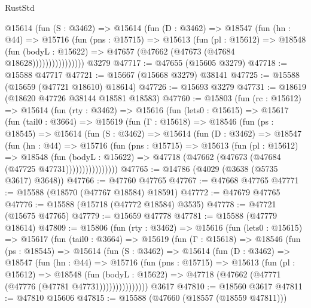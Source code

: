 \begin{lexlean}{RustStd}
\begin{coremodule}
                @15614
                  (fun (S : @3462) =>
                  @15614
                    (fun (D : @3462) =>
                    @18547
                      (fun (hn : @44) =>
                      @15716
                        (fun (pns : @15715) =>
                        @15613
                          (fun (pl : @15612) =>
                          @18548
                            (fun (bodyL : @15622) =>
                            @47657 (@47662 (@47673 (@47684 @18628))))))))))))))))
    @3279
@47717 := @47655 (@15605 @3279)
@47718 := @15588 @47717
@47721 := @15667 (@15668 @3279) @38141
@47725 := @15588 (@15659 (@47721 @18610) @18614)
@47726 := @15693 @3279
@47731 := @18619 (@18620 @47726 @38144 @18581 @18583)
@47760 := @15803
    (fun (rc : @15612) =>
    @15614
      (fun (rty : @3462) =>
      @15616
        (fun (lets0 : @15615) =>
        @15617
          (fun (tail0 : @3664) =>
          @15619
            (fun (Γ : @15618) =>
            @18546
              (fun (ps : @18545) =>
              @15614
                (fun (S : @3462) =>
                @15614
                  (fun (D : @3462) =>
                  @18547
                    (fun (hn : @44) =>
                    @15716
                      (fun (pns : @15715) =>
                      @15613
                        (fun (pl : @15612) =>
                        @18548
                          (fun (bodyL : @15622) =>
                          @47718 (@47662 (@47673 (@47684 (@47725 @47731))))))))))))))))
@47765 := @14786 (@4029 (@3638 (@5735 @3617) @3648))
@47766 := @47760 @47765
@47767 := @47668 @47765
@47771 := @15588 (@18570 (@47767 @18584) @18591)
@47772 := @47679 @47765
@47776 := @15588 (@15718 (@47772 @18584) @3535)
@47778 := @47721 (@15675 @47765)
@47779 := @15659 @47778
@47781 := @15588 (@47779 @18614)
@47809 := @15806
    (fun (rty : @3462) =>
    @15616
      (fun (lets0 : @15615) =>
      @15617
        (fun (tail0 : @3664) =>
        @15619
          (fun (Γ : @15618) =>
          @18546
            (fun (ps : @18545) =>
            @15614
              (fun (S : @3462) =>
              @15614
                (fun (D : @3462) =>
                @18547
                  (fun (hn : @44) =>
                  @15716
                    (fun (pns : @15715) =>
                    @15613
                      (fun (pl : @15612) =>
                      @18548
                        (fun (bodyL : @15622) =>
                        @47718 (@47662 (@47771 (@47776 (@47781 @47731)))))))))))))))
    @3617
@47810 := @18560 @3617
@47811 := @47810 @15606
@47815 := @15588 (@47660 (@18557 (@18559 @47811)))

\end{coremodule}
\end{lexlean}
